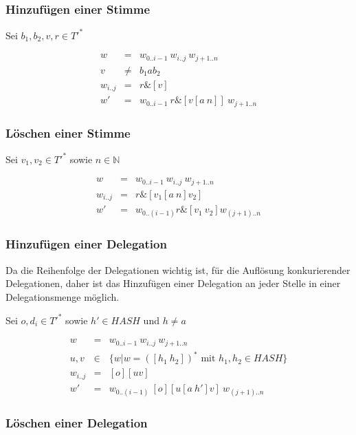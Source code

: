 \documentclass[a4paper,12pt]{report}
\begin{document}
\subsubsection{Hinzufügen einer Stimme}
Sei $b_1,b_2,v,r \in T'^*$

\begin{eqnarray}
  w &=& w_{0 .. i-1}\ w_{i..j}\ w_{j+1 .. n} \\
  v &\neq& b_1 a b_2 \\
  w_{i..j} &=& r\& [v] \\
  w' &=& w_{0 .. i-1}\ r \& [v[a\ n]]\ w_{j+1 .. n}
\end{eqnarray}

\subsubsection{Löschen einer Stimme}

Sei $v_1, v_2 \in T'^*$ sowie $n\in\mathbb{N}$

\begin{eqnarray}
  w &=& w_{0 .. i-1}\ w_{i..j}\ w_{j+1 .. n} \\
  w_{i..j}&=& r\& [v_1 [a\ n] v_2] \\
  w' &=& w_{0..(i-1)} r\& [v_1\ v_2] w_{(j+1)..n}
\end{eqnarray}


\subsubsection{Hinzufügen einer Delegation}
Da die Reihenfolge der Delegationen wichtig ist, für die Auflösung konkurierender Delegationen, daher ist das Hinzufügen einer Delegation an jeder Stelle in einer Delegationsmenge möglich.

Sei $o,d_i \in T'^*$ sowie $h'\in HASH$ und $h\neq a$

\begin{eqnarray}
  w &=& w_{0 .. i-1}\ w_{i..j}\ w_{j+1 .. n} \\
  u,v &\in& \{ w | w = ([h_1\ h_2])^*\text{ mit } h_1,h_2 \in HASH \} \\
  w_{i..j} &=& [o][uv] \\
  w' &=& w_{0 .. (i-1)}\ [o][u[a\ h']v]\ w_{(j+1) .. n}
\end{eqnarray}

\subsubsection*{Löschen einer Delegation}
\end{document}
